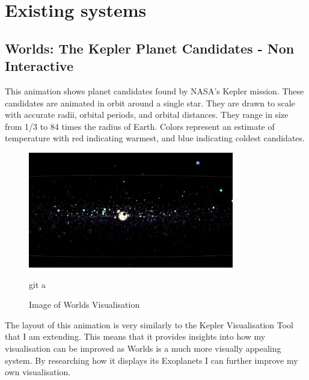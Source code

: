 \section{Existing systems}
\subsection{Worlds: The Kepler Planet Candidates - Non Interactive}
 This animation \cite{worlds} shows  planet candidates found by NASA's Kepler mission. These candidates are animated in orbit around a single star. They are drawn to scale with accurate radii, orbital periods, and orbital distances. They range in size from 1/3 to 84 times the radius of Earth. Colors represent an estimate of temperature with red indicating warmest, and blue indicating coldest candidates. 
\begin{figure}[h!]
  \centering
      \includegraphics[width=0.8\textwidth]{images/worlds.jpg}
  \caption{Image of Worlds Visualisation}git a
\end{figure}
The layout of this animation is very similarly to the Kepler Visualisation Tool that I am extending. This means that it provides insights into how my visualisation can be improved as Worlds is a much more visually appealing system. By researching how it displays its Exoplanets I can further improve my own visualisation.

